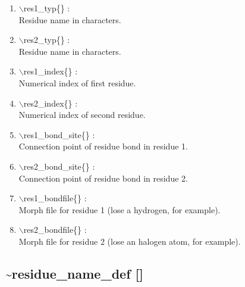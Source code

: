 \documentclass[12pt,titlepage]{article}
\begin{document}
\begin{enumerate}

 \vspace{0.15in} 
 \item  $\backslash$res1\_typ\{\} : \\ 
    Residue name in characters.

 \vspace{0.15in} 
 \item  $\backslash$res2\_typ\{\} : \\ 
    Residue name in characters.

 \vspace{0.15in} 
 \item  $\backslash$res1\_index\{\} : \\ 
    Numerical index of first residue.

 \vspace{0.15in} 
 \item  $\backslash$res2\_index\{\} : \\ 
    Numerical index of second residue.

 \vspace{0.15in} 
 \item  $\backslash$res1\_bond\_site\{\} : \\ 
   Connection point of residue bond in residue 1.

 \vspace{0.15in} 
 \item  $\backslash$res2\_bond\_site\{\} : \\ 
   Connection point of residue bond in residue 2.

 \vspace{0.15in} 
 \item  $\backslash$res1\_bondfile\{\} : \\ 
   Morph file for residue 1 (lose a hydrogen, for example).

 \vspace{0.15in} 
 \item  $\backslash$res2\_bondfile\{\} : \\ 
   Morph file for residue 2 (lose an halogen atom, for example).
  
\end{enumerate}

\newpage
\subsection*{\bf \~{ }residue\_name\_def []}
\end{document}
